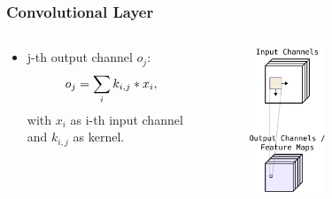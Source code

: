 \begin{frame}
  \frametitle{Convolutional Layer}
  \begin{columns}
    \begin{column}{0.5\textwidth}
      \begin{itemize}
        \item j-th output channel $o_j$:
        \begin{equation*}
          \footnotesize
          o_j = \sum_{i} k_{i, j} \ast x_i,
        \end{equation*}
        \footnotesize
        with $x_i$ as i-th input channel and $k_{i, j}$ as kernel.   
      \end{itemize}
    \end{column}
    \begin{column}{0.5\textwidth}
      \centering
      \begin{figure} \includegraphics[width=0.45\textwidth]{./figs/nn_theory_cnn_scheme.pdf} \end{figure}
      \vfill
    \end{column}
  \end{columns}
\end{frame}

